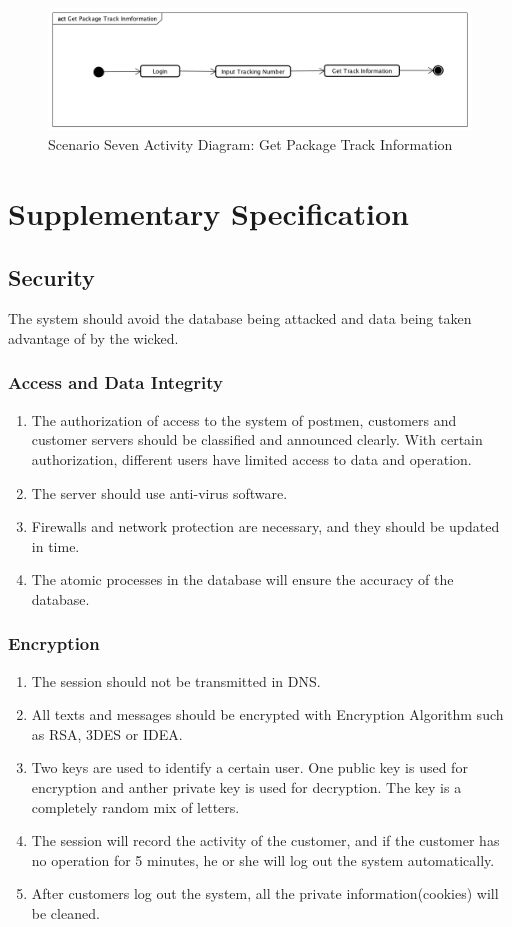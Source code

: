 \documentclass[12pt]{scrreprt}
\begin{document}
\begin{figure}[H]
  \centering\includegraphics[width=5in]{DocumentRes/8GetPackageTrackInformation.png}
  \caption{Scenario Seven Activity Diagram: Get Package Track Information}
\end{figure}

\section{Supplementary Specification}
\subsection{Security}
The system should avoid the database being attacked and data being taken
advantage of by the wicked.
\subsubsection{Access and Data Integrity}
\begin{enumerate}
  \item The authorization of access to the system of postmen, customers
  and customer servers should be classified and announced clearly. With
  certain authorization, different users have limited access to data and
  operation.
  \item The server should use anti-virus software.
  \item Firewalls and network protection are necessary, and they should
  be updated in time.
  \item The atomic processes in the database will ensure the accuracy
  of the database.
\end{enumerate}

\subsubsection{Encryption}
\begin{enumerate}
  \item The session should not be transmitted in DNS.
  \item All texts and messages should be encrypted with Encryption Algorithm
  such as RSA, 3DES or IDEA.
  \item Two keys are used to identify a certain user. One public key is
  used for encryption and anther private key is used for decryption.
  The key is a completely random mix of letters.
  \item The session will record the activity of the customer, and if the
  customer has no operation for 5 minutes, he or she will log out the system
  automatically.
  \item After customers log out the system, all the private information(cookies)
  will be cleaned.
\end{enumerate}
\end{document}
